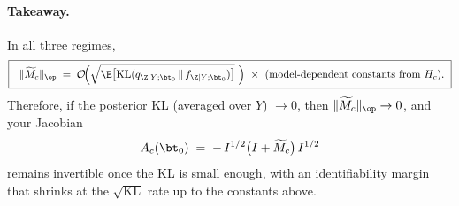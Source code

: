 \paragraph{Takeaway.}
In all three regimes,
\[
\boxed{\ \ \|\widetilde M_c\|_{\op} \;=\; \mathcal O\!\Big(\sqrt{\E\big[\mathrm{KL}(q_{\Z|Y;\bt_0}\,\|\,f_{\Z|Y;\bt_0})\big]}\ \Big)
\ \times\ \text{(model-dependent constants from }H_c).\ }
\]
Therefore, if the posterior KL (averaged over $Y$) $\to 0$, then $\|\widetilde M_c\|_{\op}\to 0$, and your Jacobian
\[
A_c(\bt_0)\;=\;-\,I^{1/2}\big(I+\widetilde M_c\big)\,I^{1/2}
\]
remains invertible once the KL is small enough, with an identifiability margin that shrinks at the $\sqrt{\text{KL}}$ rate up to the constants above.
